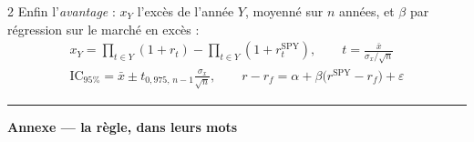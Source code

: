 \documentclass[9pt,a4paper]{extarticle}
\begin{document}
\begin{multicols}{2}
Enfin l'\emph{avantage} : $x_Y$ l'excès de l'année $Y$, moyenné sur $n$ années, et $\beta$ par régression sur le marché en excès :
\[ \begin{gathered}
x_Y=\prod_{t\in Y}(1{+}r_t)-\prod_{t\in Y}(1{+}r^{\mathrm{SPY}}_t),\qquad t=\frac{\bar x}{\sigma_x/\sqrt{n}} \\[0.6mm]
\mathrm{IC}_{95\%}=\bar x\pm t_{0{,}975,\,n-1}\tfrac{\sigma_x}{\sqrt n},\qquad
r-r_f=\alpha+\beta\bigl(r^{\mathrm{SPY}}-r_f\bigr)+\varepsilon
\end{gathered} \]
\end{multicols}

\vspace{1.5mm}\hrule\vspace{1.5mm}
{\color{bleu}\bfseries\large Annexe --- la règle, dans leurs mots}\par\vspace{1.2mm}
\end{document}
